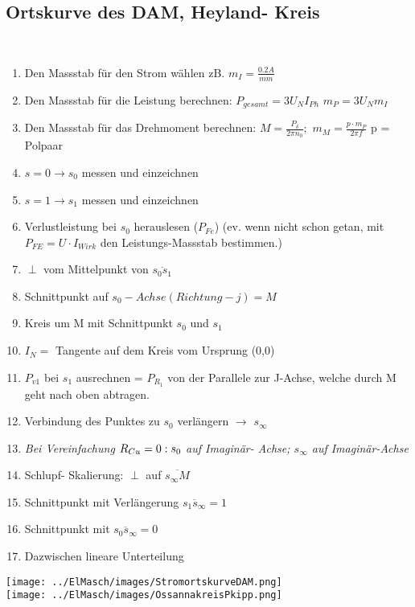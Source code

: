     \subsection{Ortskurve des DAM, Heyland- Kreis}
        \begin{minipage}{9cm}
        \end{minipage}
        \begin{minipage}{8cm}
        \end{minipage} \\
        \begin{minipage}{10.5cm}
            \begin{enumerate}     
                \item Den Massstab für den Strom wählen zB. $m_I=\frac{0.2 A}{mm}$
                \item Den Massstab für die Leistung berechnen: $P_{gesamt}=3U_N I_{Ph}$ $m_P=3U_N m_I$
                \item Den Massstab für das Drehmoment berechnen: $M=\frac{P_\delta}{2\pi n_0};$  $m_M= \frac{p\cdot m_P}{2\pi f}$  p = Polpaar
                \item $s=0 \rightarrow s_{0}$ messen und einzeichnen
                \item $s=1 \rightarrow s_{1}$ messen und einzeichnen
                \item Verlustleistung bei $s_{0}$ herauslesen ($P_{Fe}$) (ev. wenn nicht schon getan, mit \\ $P_{FE} = U \cdot I_{Wirk}$ den Leistungs-Massstab bestimmen.)\\
                \item $\perp$ vom Mittelpunkt von $\overline{s_{0}s_{1}}$
                \item Schnittpunkt auf $s_{0}- Achse (Richtung -j) = M$
                \item Kreis um M mit Schnittpunkt $s_{0}$ und $s_{1}$
                \item $I_N =$ Tangente auf dem Kreis vom Ursprung (0,0)
                \item $P_{v1}$ bei $s_{1}$ ausrechnen = $P_{R_1}$ von der Parallele zur J-Achse, welche durch M geht nach oben abtragen.
                \item Verbindung des Punktes zu $s_{0}$ verlängern $\rightarrow$ $s_{\infty}$
                \item \textit{ Bei Vereinfachung $R_{Cu}=0:\\ s_{0}$ auf Imaginär- Achse; $s_{\infty}$ auf Imaginär-Achse}
                \item Schlupf- Skalierung: $\perp$ auf $\overline{s_{\infty}M}$
                \item Schnittpunkt mit Verlängerung $\overline{s_{1}s_{\infty}}= 1$
                \item Schnittpunkt mit $\overline{s_{0}s_{\infty}}= 0$
                \item Dazwischen lineare Unterteilung
            \end{enumerate}
        \end{minipage}
        \begin{minipage}{7cm}
            \texttt{[image: ../ElMasch/images/StromortskurveDAM.png]}\\
            \texttt{[image: ../ElMasch/images/OssannakreisPkipp.png]}
        \end{minipage}